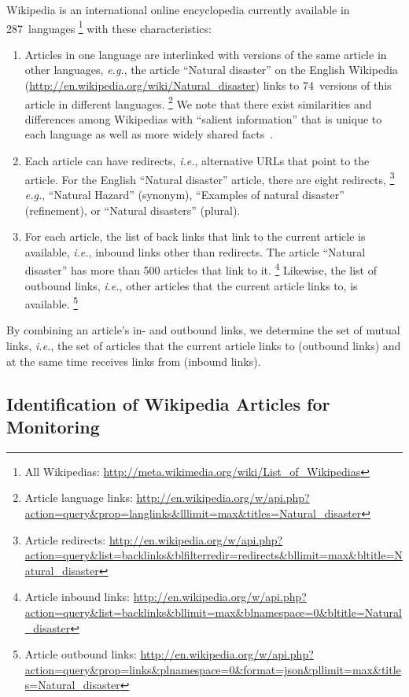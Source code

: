 \documentclass[letterpaper]{article}
\begin{document}
Wikipedia is an international online encyclopedia
currently available in 287~languages%
\footnote{All Wikipedias: \url{http://meta.wikimedia.org/wiki/List_of_Wikipedias}}
with these characteristics:
\begin{enumerate}
  \item Articles in one language are interlinked with versions of the same article
  in other languages, \emph{e.g.}, the article ``Natural disaster''
  on the English Wikipedia
  (\url{http://en.wikipedia.org/wiki/Natural_disaster})
  links to 74~versions of this article in different languages.%
  \footnote{Article language links:
  \url{http://en.wikipedia.org/w/api.php?action=query&prop=langlinks&lllimit=max&titles=Natural_disaster}}
  We note that there exist similarities and differences among Wikipedias
  with ``salient information'' that is unique to each language as well as more widely shared facts~\cite{bao2012omnipedia}.
  \item Each article can have redirects, \emph{i.e.}, alternative URLs
  that point to the article.
  For the English ``Natural disaster'' article, there are eight redirects,%
  \footnote{Article redirects:
  \url{http://en.wikipedia.org/w/api.php?action=query&list=backlinks&blfilterredir=redirects&bllimit=max&bltitle=Natural_disaster}}
  \emph{e.g.}, ``Natural Hazard'' (synonym),
  ``Examples of natural disaster'' (refinement), or
  ``Natural disasters'' (plural).
  \item For each article, the list of back links
  that link to the current article is available, \emph{i.e.},
  inbound links other than redirects.
  The article ``Natural disaster'' has more than 500 articles that link to it.%
  \footnote{Article inbound links: \url{http://en.wikipedia.org/w/api.php?action=query&list=backlinks&bllimit=max&blnamespace=0&bltitle=Natural_disaster}}
  Likewise, the list of outbound links, \emph{i.e.}, other articles
  that the current article links to, is available.%
  \footnote{Article outbound links: \url{http://en.wikipedia.org/w/api.php?action=query&prop=links&plnamespace=0&format=json&pllimit=max&titles=Natural_disaster}}
\end{enumerate}
By combining an article's in- and outbound links,
we determine the set of mutual links,
\emph{i.e.}, the set of articles that the current article links to (outbound links)
and at the same time receives links from (inbound links).

\subsection{Identification of Wikipedia Articles for Monitoring}
\label{sec:identification-of-monitoring}
\end{document}
